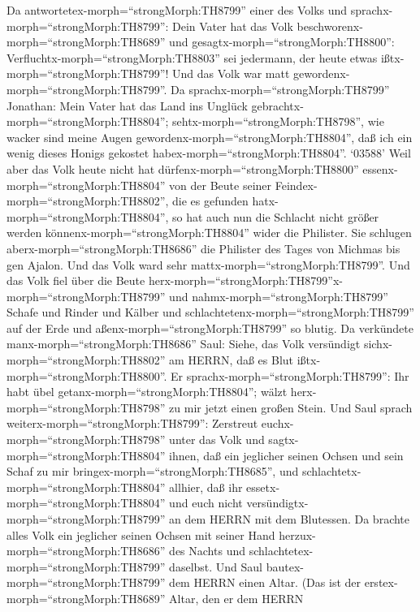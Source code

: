  Da antwortetex-morph=``strongMorph:TH8799'' einer des
Volks und sprachx-morph=``strongMorph:TH8799'': Dein Vater hat das Volk
beschworenx-morph=``strongMorph:TH8689'' und
gesagtx-morph=``strongMorph:TH8800'':
Verfluchtx-morph=``strongMorph:TH8803'' sei jedermann, der heute etwas
ißtx-morph=``strongMorph:TH8799''! Und das Volk war matt
gewordenx-morph=``strongMorph:TH8799''.  Da
sprachx-morph=``strongMorph:TH8799'' Jonathan: Mein Vater hat das Land
ins Unglück gebrachtx-morph=``strongMorph:TH8804'';
sehtx-morph=``strongMorph:TH8798'', wie wacker sind meine Augen
gewordenx-morph=``strongMorph:TH8804'', daß ich ein wenig dieses Honigs
gekostet habex-morph=``strongMorph:TH8804''.  `03588' Weil
aber das Volk heute nicht hat dürfenx-morph=``strongMorph:TH8800''
essenx-morph=``strongMorph:TH8804'' von der Beute seiner
Feindex-morph=``strongMorph:TH8802'', die es gefunden
hatx-morph=``strongMorph:TH8804'', so hat auch nun die Schlacht nicht
größer werden könnenx-morph=``strongMorph:TH8804'' wider die Philister.
 Sie schlugen aberx-morph=``strongMorph:TH8686'' die
Philister des Tages von Michmas bis gen Ajalon. Und das Volk ward sehr
mattx-morph=``strongMorph:TH8799''.  Und das Volk fiel über
die Beute
herx-morph=``strongMorph:TH8799''x-morph=``strongMorph:TH8799'' und
nahmx-morph=``strongMorph:TH8799'' Schafe und Rinder und Kälber und
schlachtetenx-morph=``strongMorph:TH8799'' auf der Erde und
aßenx-morph=``strongMorph:TH8799'' so blutig.  Da
verkündete manx-morph=``strongMorph:TH8686'' Saul: Siehe, das Volk
versündigt sichx-morph=``strongMorph:TH8802'' am HERRN, daß es Blut
ißtx-morph=``strongMorph:TH8800''. Er
sprachx-morph=``strongMorph:TH8799'': Ihr habt übel
getanx-morph=``strongMorph:TH8804''; wälzt
herx-morph=``strongMorph:TH8798'' zu mir jetzt einen großen Stein.
 Und Saul sprach weiterx-morph=``strongMorph:TH8799'':
Zerstreut euchx-morph=``strongMorph:TH8798'' unter das Volk und
sagtx-morph=``strongMorph:TH8804'' ihnen, daß ein jeglicher seinen
Ochsen und sein Schaf zu mir bringex-morph=``strongMorph:TH8685'', und
schlachtetx-morph=``strongMorph:TH8804'' allhier, daß ihr
essetx-morph=``strongMorph:TH8804'' und euch nicht
versündigtx-morph=``strongMorph:TH8799'' an dem HERRN mit dem Blutessen.
Da brachte alles Volk ein jeglicher seinen Ochsen mit seiner Hand
herzux-morph=``strongMorph:TH8686'' des Nachts und
schlachtetex-morph=``strongMorph:TH8799'' daselbst.  Und
Saul bautex-morph=``strongMorph:TH8799'' dem HERRN einen Altar. (Das ist
der erstex-morph=``strongMorph:TH8689'' Altar, den er dem HERRN
